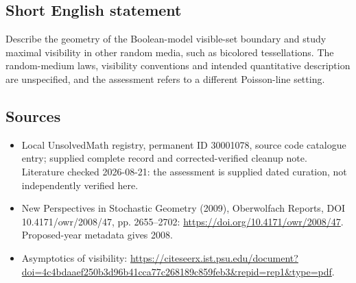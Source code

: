 \documentclass[11pt]{article}
\begin{document}
\subsection{Short English statement}
Describe the geometry of the Boolean-model visible-set boundary and study maximal visibility in other random media, such as bicolored tessellations. The random-medium laws, visibility conventions and intended quantitative description are unspecified, and the assessment refers to a different Poisson-line setting.
\subsection{Sources}
\begin{itemize}
\item Local UnsolvedMath registry, permanent ID 30001078, source code catalogue entry; supplied complete record and corrected-verified cleanup note. Literature checked 2026-08-21: the assessment is supplied dated curation, not independently verified here.
\item New Perspectives in Stochastic Geometry (2009), Oberwolfach Reports, DOI 10.4171/owr/2008/47, pp. 2655--2702: \url{https://doi.org/10.4171/owr/2008/47}. Proposed-year metadata gives 2008.
\item Asymptotics of visibility: \url{https://citeseerx.ist.psu.edu/document?doi=4c4bdaaef250b3d96b41cca77c268189c859feb3&repid=rep1&type=pdf}.
\end{itemize}
\end{document}
